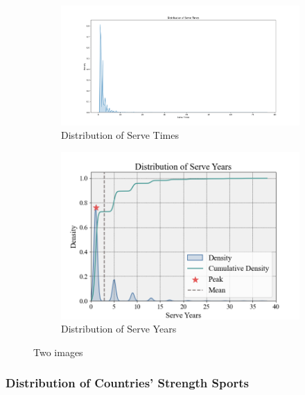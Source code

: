 \documentclass[12pt]{article}  %
\begin{document}
\begin{figure}[htbp]
	\centering
	\begin{subfigure}[b]{.55\textwidth}
		\includegraphics[width=\textwidth]{img/Times.png}
		\caption{Distribution of Serve Times}\label{subfig:left}
	\end{subfigure}
	\begin{subfigure}[b]{.4\textwidth}
		\includegraphics[width=\textwidth]{img/Years.png}
		\caption{Distribution of Serve Years}\label{subfig:right}
	\end{subfigure}
	\caption{Two images}\label{fig:subfigures}
\end{figure}

\subsubsection{Distribution of Countries' Strength Sports}
\end{document}
